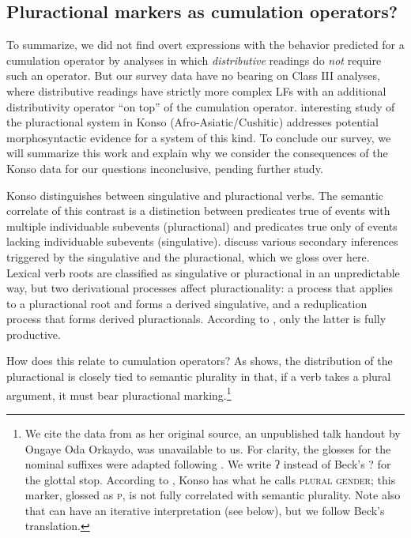 \documentclass[output=paper]{langscibook}
\begin{document}
\subsection{Pluractional markers as cumulation operators?}\label{has-sch:sec:3.4}

To summarize, we did not find overt expressions with the behavior predicted for a cumulation operator by analyses in which \textit{distributive} readings  do \textit{not} require such an operator. But our survey data have no bearing on Class III analyses, where distributive readings have strictly more complex LFs with an additional distributivity operator ``on top'' of the cumulation operator.  interesting study of the pluractional system in Konso (Afro-Asiatic/Cushitic) addresses potential morphosyntactic evidence for a system of this kind.  To conclude our survey, we will summarize this work and explain why we consider the consequences of the Konso data for our questions inconclusive, pending further study.

Konso distinguishes between singulative and pluractional verbs. The semantic correlate of this contrast is a distinction between predicates true of events with multiple individuable subevents (pluractional)
and predicates true  only of events lacking individuable subevents (singulative). \citet{Ongaye:2017} discuss various secondary inferences triggered by the singulative and the pluractional, which we gloss over here. Lexical verb roots are classified as singulative or pluractional in an unpredictable way, but  two derivational processes  affect pluractionality: a process that applies to a pluractional root and forms a derived singulative, and a reduplication process that forms derived pluractionals. According to \citet{Ongaye:2017}, only the latter is fully productive.

How does this relate to cumulation operators? As  shows, the distribution of the pluractional is closely tied to semantic plurality in that, if a verb takes a plural argument, it must bear pluractional marking.\footnote{We cite the data from \citet{Beck:2012} as her original source, an unpublished talk handout by Ongaye Oda Orkaydo, was unavailable to us. For clarity, the glosses for the nominal suffixes were adapted following \citet{Ongaye:2013}. We write ʔ instead of Beck's ? for the glottal stop. According to \citet{Ongaye:2013}, Konso has what he calls \textsc{plural gender}; this marker, glossed as \textsc{p}, is not fully correlated with semantic plurality. Note also that  can have an iterative interpretation (see below), but we follow Beck's translation.}
\end{document}
